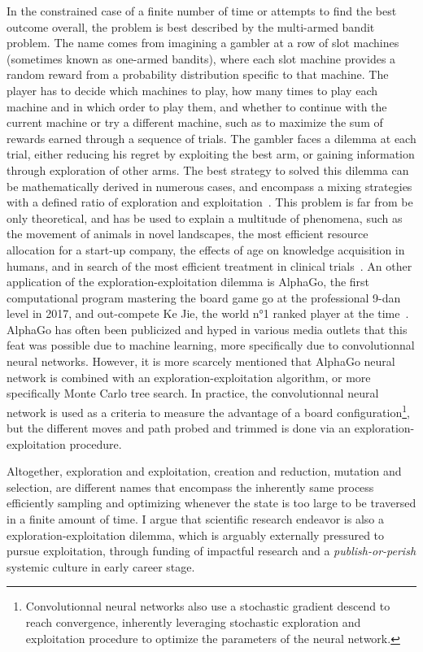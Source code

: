 In the constrained case of a finite number of time or attempts to find the best outcome overall, the problem is best described by the multi-armed bandit problem.
The name comes from imagining a gambler at a row of slot machines (sometimes known as one-armed bandits), where each slot machine provides a random reward from a probability distribution specific to that machine. The player has to decide which machines to play, how many times to play each machine and in which order to play them, and whether to continue with the current machine or try a different machine, such as to maximize the sum of rewards earned through a sequence of trials.
The gambler faces a dilemma at each trial, either reducing his regret by exploiting the best arm, or gaining information through exploration of other arms.
The best strategy to solved this dilemma can be mathematically derived in numerous cases, and encompass a mixing strategies with a defined ratio of exploration and exploitation~\citep{Auer2002,Kocsis2006,Furnkranz2006}.
This problem is far from be only theoretical, and has be used to explain a multitude of phenomena, such as the movement of animals in novel landscapes, the most efficient resource allocation for a start-up company, the effects of age on knowledge acquisition in humans, and in search of the most efficient treatment in clinical trials~\citep{Berger-Tal2014, March}.
An other application of the exploration-exploitation dilemma is AlphaGo, the first computational program mastering the board game go at the professional 9-dan level in 2017, and out-compete Ke Jie, the world n°1 ranked player at the time~\citep{Silver2017, Silver2018}.
AlphaGo has often been publicized and hyped in various media outlets that this feat was possible due to machine learning, more specifically due to convolutionnal neural networks.
However, it is more scarcely mentioned that AlphaGo neural network is combined with an exploration-exploitation algorithm, or more specifically Monte Carlo tree search.
In practice, the convolutionnal neural network is used as a criteria to measure the advantage of a board configuration\footnote{Convolutionnal neural networks also use a stochastic gradient descend to reach convergence, inherently leveraging stochastic exploration and exploitation procedure to optimize the parameters of the neural network.}, but the different moves and path probed and trimmed is done via an exploration-exploitation procedure.


Altogether, exploration and exploitation, creation and reduction, mutation and selection, are different names that encompass the inherently same process efficiently sampling and optimizing whenever the state is too large to be traversed in a finite amount of time.
I argue that scientific research endeavor is also a exploration-exploitation dilemma, which is arguably externally pressured to pursue exploitation, through funding of impactful research and a \textit{publish-or-perish} systemic culture in early career stage.

